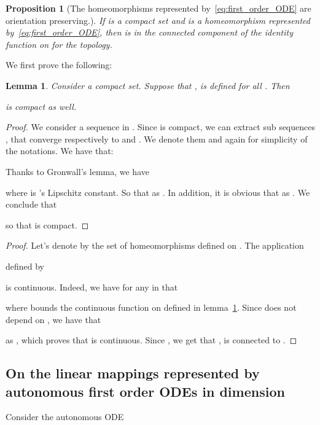 \documentclass{article}
\newtheorem{lemma}{Lemma}
\newtheorem{proposition}{Proposition}
\begin{document}
\begin{proposition}[The homeomorphisms represented by~\eqref{eq:first_order_ODE} are orientation preserving.]\label{prop:connexe}
If  is a compact set and  is a homeomorphism represented by~\eqref{eq:first_order_ODE}, then  is in the connected component of the identity function on  for the  topology.
\end{proposition}
We first prove the following: 
\begin{lemma}\label{lemma:compactness}
Consider  a compact set. Suppose that ,  is defined for all .
Then 

is compact as well.
\end{lemma}
\begin{proof}
We consider  a sequence in . Since  is compact, we can extract sub sequences ,  that converge respectively to  and . We denote them  and  again for simplicity of the notations.
We have that:

Thanks to Gronwall's lemma, we have

where  is 's Lipschitz constant. So that  as .
In addition, it is obvious that  as .
We conclude that

so that  is compact.
\end{proof}

\begin{proof}
Let's denote by  the set of homeomorphisms defined on . The application 

defined by

is continuous. Indeed, we have for any  in  that 

where  bounds the continuous function  on  defined in lemma~\ref{lemma:compactness}.
Since  does not depend on , we have that 

as , which proves that  is continuous.
Since , we get that ,  is connected to .
\end{proof}



\subsection{On the linear mappings represented by autonomous first order ODEs in dimension }

Consider the autonomous ODE
\end{document}
